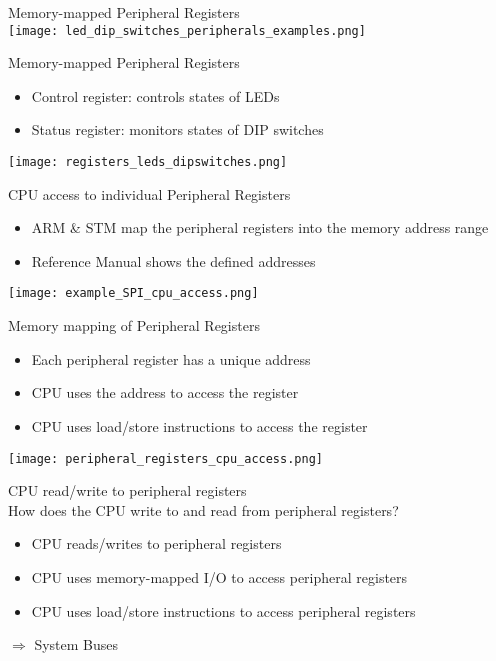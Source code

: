 \begin{examplecode}{Memory-mapped Peripheral Registers}\\
\texttt{[image: led\_dip\_switches\_peripherals\_examples.png]}
\end{examplecode}

\begin{definition}{Memory-mapped Peripheral Registers}
    \begin{itemize}
        \item Control register: controls states of LEDs
        \item Status register: monitors states of DIP switches
    \end{itemize}
    \vspace{1mm}
    \texttt{[image: registers\_leds\_dipswitches.png]}
\end{definition}

\multend

\begin{concept}{CPU access to individual Peripheral Registers}
    \begin{itemize}
        \item ARM \& STM map the peripheral registers into
        the memory address range
        \item Reference Manual shows the defined addresses
    \end{itemize}
    \vspace{2mm}
    \texttt{[image: example\_SPI\_cpu\_access.png]}
\end{concept}


\begin{definition}{Memory mapping of Peripheral Registers}
    \begin{itemize}
        \item Each peripheral register has a unique address
        \item CPU uses the address to access the register
        \item CPU uses load/store instructions to access the register
    \end{itemize}
    \texttt{[image: peripheral\_registers\_cpu\_access.png]}
\end{definition}

\begin{concept}{CPU read/write to peripheral registers}\\
    How does the CPU write to and read from peripheral registers?
    \vspace{-2mm}\\
    \begin{itemize}
        \item CPU reads/writes to peripheral registers
        \item CPU uses memory-mapped I/O to access peripheral registers
        \item CPU uses load/store instructions to access peripheral registers
    \end{itemize}
    $\Rightarrow$ System Buses
\end{concept}

